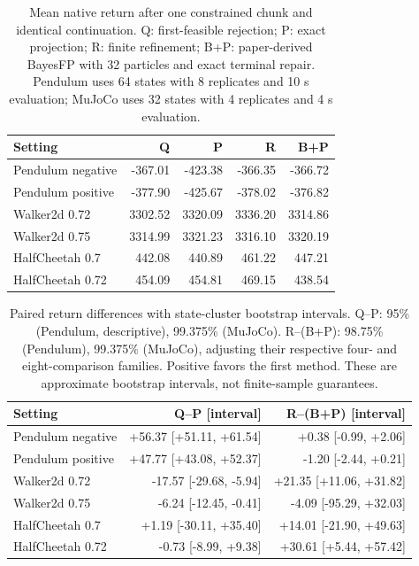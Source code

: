 \begin{table}[t]
\caption{Mean native return after one constrained chunk and identical continuation. Q: first-feasible rejection; P: exact projection; R: finite refinement; B+P: paper-derived BayesFP with 32 particles and exact terminal repair. Pendulum uses 64 states with 8 replicates and 10 s evaluation; MuJoCo uses 32 states with 4 replicates and 4 s evaluation.}
\label{tab:chunk-return}
\centering\small
\begin{tabular}{lrrrr}
\toprule
Setting & Q & P & R & B+P \\
\midrule
Pendulum negative & -367.01 & -423.38 & -366.35 & -366.72 \\
Pendulum positive & -377.90 & -425.67 & -378.02 & -376.82 \\
Walker2d 0.72 & 3302.52 & 3320.09 & 3336.20 & 3314.86 \\
Walker2d 0.75 & 3314.99 & 3321.23 & 3316.10 & 3320.19 \\
HalfCheetah 0.7 & 442.08 & 440.89 & 461.22 & 447.21 \\
HalfCheetah 0.72 & 454.09 & 454.81 & 469.15 & 438.54 \\
\bottomrule
\end{tabular}
\end{table}

\begin{table}[t]
\caption{Paired return differences with state-cluster bootstrap intervals. Q--P: 95\% (Pendulum, descriptive), 99.375\% (MuJoCo). R--(B+P): 98.75\% (Pendulum), 99.375\% (MuJoCo), adjusting their respective four- and eight-comparison families. Positive favors the first method. These are approximate bootstrap intervals, not finite-sample guarantees.}
\label{tab:chunk-differences}
\centering\footnotesize
\begin{tabular}{lrr}
\toprule
Setting & Q--P [interval] & R--(B+P) [interval] \\
\midrule
Pendulum negative & +56.37 [+51.11, +61.54] & +0.38 [-0.99, +2.06] \\
Pendulum positive & +47.77 [+43.08, +52.37] & -1.20 [-2.44, +0.21] \\
Walker2d 0.72 & -17.57 [-29.68, -5.94] & +21.35 [+11.06, +31.82] \\
Walker2d 0.75 & -6.24 [-12.45, -0.41] & -4.09 [-95.29, +32.03] \\
HalfCheetah 0.7 & +1.19 [-30.11, +35.40] & +14.01 [-21.90, +49.63] \\
HalfCheetah 0.72 & -0.73 [-8.99, +9.38] & +30.61 [+5.44, +57.42] \\
\bottomrule
\end{tabular}
\end{table}
